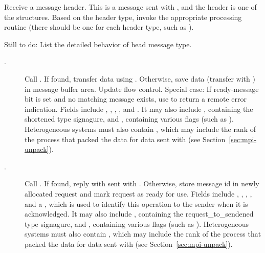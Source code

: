 \documentclass{article}
\begin{document}
\begin{tcp}
Receive a message header.  This is a message sent with ,
and the header is one of the  structures.
Based on the header type, invoke the appropriate processing routine (there
should be one for each header type, such as
). 

Still to do:  List the detailed behavior of head message type.
\begin{description}
\item[.]
Call .  If found, transfer data using
.  Otherwise, save data (transfer with ) in
message buffer area.  Update flow control.
Special case: If ready-message bit is set and no matching message
exists, use  to return a remote error
indication.
Fields include ,
, ,
, and
.  It may also include
, containing the shortened type
signagure, and , containing various flags
(such as ).  Heterogeneous systems must
also contain , which may include
the rank of the process that packed the data for data sent with
 (see Section~\ref{sec:mpi-unpack}).

\item[.]
Call .  If found, reply with
 sent with .  Otherwise,
store message id in newly allocated request and mark request as ready
for use.  
Fields include ,
,
, 
, and a
, which is used to
identify this operation to the sender when it is acknowledged.  
It may also include
, containing the
request_to_sendened type 
signagure, and , containing
various flags 
(such as ).  Heterogeneous systems must
also contain , which may include
the rank of the process that packed the data for data sent with
 (see Section~\ref{sec:mpi-unpack}).


\end{description}
\end{tcp}
\end{document}
